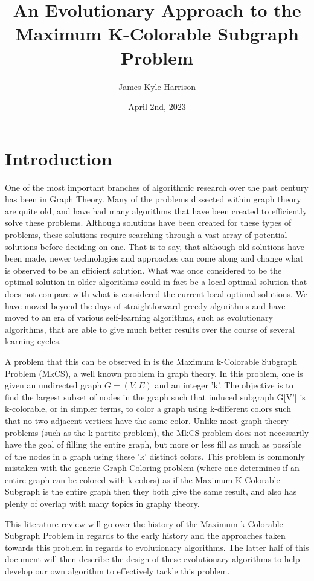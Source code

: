 \documentclass{article}
\title{An Evolutionary Approach to the Maximum K-Colorable Subgraph Problem}
\author{James Kyle Harrison}
\date{April 2nd, 2023}
\begin{document}
\maketitle

\section{Introduction}
 \hspace{\parindent} One of the most important branches of algorithmic research over the past century has been in Graph Theory. Many of the problems dissected within graph theory are quite old, and have had many algorithms that have been created to efficiently solve these problems. Although solutions have been created for these types of problems, these solutions require searching through a vast array of potential solutions before deciding on one. That is to say, that although old solutions have been made, newer technologies and approaches can come along and change what is observed to be an efficient solution. What was once considered to be the optimal solution in older algorithms could in fact be a local optimal solution that does not compare with what is considered the current local optimal solutions. We have moved beyond the days of straightforward greedy algorithms and have moved to an era of various self-learning algorithms, such as evolutionary algorithms, that are able to give much better results over the course of several learning cycles.
 \par A problem that this can be observed in is the Maximum k-Colorable Subgraph Problem (MkCS), a well known problem in graph theory. In this problem, one is given an undirected graph $ G = (V,E)$ and an integer 'k'. The objective is to find the largest subset of nodes in the graph such that induced subgraph G[V'] is k-colorable, or in simpler terms, to color a graph using k-different colors such that no two adjacent vertices have the same color. Unlike most graph theory problems (such as the k-partite problem), the MkCS problem does not necessarily have the goal of filling the entire graph, but more or less fill as much as possible of the nodes in a graph using these 'k' distinct colors. This problem is commonly mistaken with the generic Graph Coloring problem (where one determines if an entire graph can be colored with k-colors) as if the Maximum K-Colorable Subgraph is the entire graph then they both give the same result, and also has plenty of overlap with many topics in graphy theory.
 \par This literature review will go over the history of the Maximum k-Colorable Subgraph Problem in regards to the early history and the approaches taken towards this problem in regards to evolutionary algorithms. The latter half of this document will then describe the design of these evolutionary algorithms to help develop our own algorithm to effectively tackle this problem.
\end{document}
